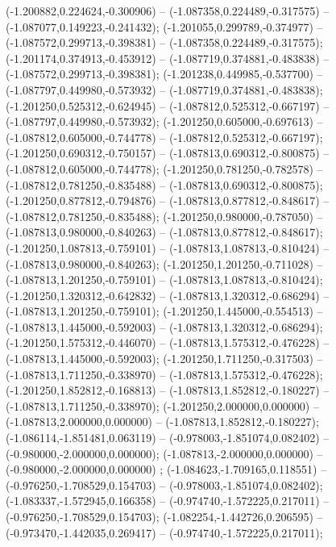  (-1.200882,0.224624,-0.300906) -- (-1.087358,0.224489,-0.317575) -- (-1.087077,0.149223,-0.241432);
 (-1.201055,0.299789,-0.374977) -- (-1.087572,0.299713,-0.398381) -- (-1.087358,0.224489,-0.317575);
 (-1.201174,0.374913,-0.453912) -- (-1.087719,0.374881,-0.483838) -- (-1.087572,0.299713,-0.398381);
 (-1.201238,0.449985,-0.537700) -- (-1.087797,0.449980,-0.573932) -- (-1.087719,0.374881,-0.483838);
 (-1.201250,0.525312,-0.624945) -- (-1.087812,0.525312,-0.667197) -- (-1.087797,0.449980,-0.573932);
 (-1.201250,0.605000,-0.697613) -- (-1.087812,0.605000,-0.744778) -- (-1.087812,0.525312,-0.667197);
 (-1.201250,0.690312,-0.750157) -- (-1.087813,0.690312,-0.800875) -- (-1.087812,0.605000,-0.744778);
 (-1.201250,0.781250,-0.782578) -- (-1.087812,0.781250,-0.835488) -- (-1.087813,0.690312,-0.800875);
 (-1.201250,0.877812,-0.794876) -- (-1.087813,0.877812,-0.848617) -- (-1.087812,0.781250,-0.835488);
 (-1.201250,0.980000,-0.787050) -- (-1.087813,0.980000,-0.840263) -- (-1.087813,0.877812,-0.848617);
 (-1.201250,1.087813,-0.759101) -- (-1.087813,1.087813,-0.810424) -- (-1.087813,0.980000,-0.840263);
 (-1.201250,1.201250,-0.711028) -- (-1.087813,1.201250,-0.759101) -- (-1.087813,1.087813,-0.810424);
 (-1.201250,1.320312,-0.642832) -- (-1.087813,1.320312,-0.686294) -- (-1.087813,1.201250,-0.759101);
 (-1.201250,1.445000,-0.554513) -- (-1.087813,1.445000,-0.592003) -- (-1.087813,1.320312,-0.686294);
 (-1.201250,1.575312,-0.446070) -- (-1.087813,1.575312,-0.476228) -- (-1.087813,1.445000,-0.592003);
 (-1.201250,1.711250,-0.317503) -- (-1.087813,1.711250,-0.338970) -- (-1.087813,1.575312,-0.476228);
 (-1.201250,1.852812,-0.168813) -- (-1.087813,1.852812,-0.180227) -- (-1.087813,1.711250,-0.338970);
 (-1.201250,2.000000,0.000000) -- (-1.087813,2.000000,0.000000) -- (-1.087813,1.852812,-0.180227);
 (-1.086114,-1.851481,0.063119) -- (-0.978003,-1.851074,0.082402) -- (-0.980000,-2.000000,0.000000);
 (-1.087813,-2.000000,0.000000) -- (-0.980000,-2.000000,0.000000) ;
 (-1.084623,-1.709165,0.118551) -- (-0.976250,-1.708529,0.154703) -- (-0.978003,-1.851074,0.082402);
 (-1.083337,-1.572945,0.166358) -- (-0.974740,-1.572225,0.217011) -- (-0.976250,-1.708529,0.154703);
 (-1.082254,-1.442726,0.206595) -- (-0.973470,-1.442035,0.269417) -- (-0.974740,-1.572225,0.217011);
